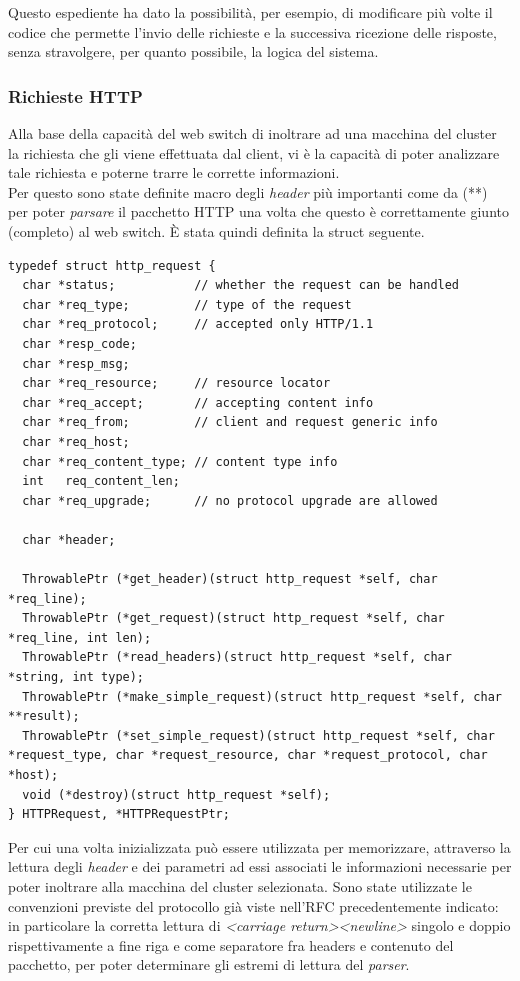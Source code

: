\documentclass[italian]{tktltiki2}
\begin{document}
Questo espediente ha dato la possibilità, per esempio, di modificare più volte il codice che permette l'invio delle richieste e la successiva ricezione delle risposte, senza stravolgere, per quanto possibile, la logica del sistema.
\subsubsection*{Richieste HTTP}
Alla base della capacità del web switch di inoltrare ad una macchina del cluster la richiesta che gli viene effettuata dal client, vi è la capacità di poter analizzare tale richiesta e poterne trarre le corrette informazioni. \\
Per questo sono state definite macro degli \emph{header} più importanti come da (**) per poter \emph{parsare} il pacchetto HTTP una volta che questo è correttamente giunto (completo) al web switch. È stata quindi definita la struct seguente.
\begin{lstlisting}
typedef struct http_request {
  char *status;           // whether the request can be handled
  char *req_type;         // type of the request
  char *req_protocol;     // accepted only HTTP/1.1
  char *resp_code;
  char *resp_msg;
  char *req_resource;     // resource locator
  char *req_accept;       // accepting content info
  char *req_from;         // client and request generic info
  char *req_host;
  char *req_content_type; // content type info
  int   req_content_len;
  char *req_upgrade;      // no protocol upgrade are allowed

  char *header;                                

  ThrowablePtr (*get_header)(struct http_request *self, char *req_line);
  ThrowablePtr (*get_request)(struct http_request *self, char *req_line, int len);
  ThrowablePtr (*read_headers)(struct http_request *self, char *string, int type);
  ThrowablePtr (*make_simple_request)(struct http_request *self, char **result);
  ThrowablePtr (*set_simple_request)(struct http_request *self, char *request_type, char *request_resource, char *request_protocol, char *host);
  void (*destroy)(struct http_request *self);
} HTTPRequest, *HTTPRequestPtr;

\end{lstlisting}
Per cui una volta inizializzata può essere utilizzata per memorizzare, attraverso la lettura degli \emph{header} e dei parametri ad essi associati le informazioni necessarie per poter inoltrare alla macchina del cluster selezionata. Sono state utilizzate le convenzioni previste del protocollo già viste nell'RFC precedentemente indicato: in particolare la corretta lettura di \emph{<carriage return><newline>} singolo e doppio rispettivamente a fine riga e come separatore fra headers e contenuto del pacchetto, per poter determinare gli estremi di lettura del \emph{parser}.
\end{document}
